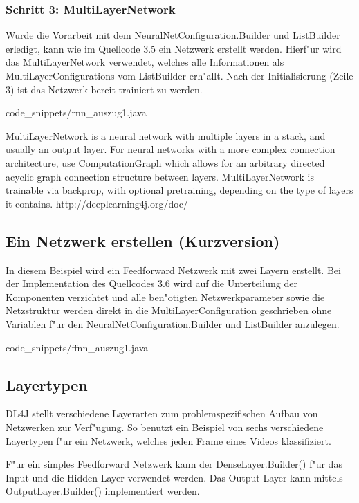 {\subsubsection{Schritt 3: MultiLayerNetwork}
Wurde die Vorarbeit mit dem NeuralNetConfiguration.Builder und ListBuilder erledigt, kann wie im Quellcode 3.5 ein Netzwerk erstellt werden. Hierf"ur wird das MultiLayerNetwork verwendet, welches alle Informationen als MultiLayerConfigurations vom ListBuilder erh"allt. Nach der Initialisierung (Zeile 3) ist das Netzwerk bereit trainiert zu werden.

{code_snippets/rnn_auszug1.java}

MultiLayerNetwork is a neural network with multiple layers in a stack, and usually an output layer. For neural networks with a more complex connection architecture, use ComputationGraph which allows for an arbitrary directed acyclic graph connection structure between layers. MultiLayerNetwork is trainable via backprop, with optional pretraining, depending on the type of layers it contains.
http://deeplearning4j.org/doc/

\subsection{Ein Netzwerk erstellen (Kurzversion)}
In diesem Beispiel wird ein Feedforward Netzwerk mit zwei Layern erstellt. Bei der Implementation des Quellcodes 3.6 wird auf die Unterteilung der Komponenten verzichtet und alle ben"otigten Netzwerkparameter sowie die Netzstruktur werden direkt in die MultiLayerConfiguration geschrieben ohne Variablen f"ur den NeuralNetConfiguration.Builder und ListBuilder anzulegen.

{code_snippets/ffnn_auszug1.java}

\subsection{Layertypen}
DL4J stellt verschiedene Layerarten zum problemspezifischen Aufbau von Netzwerken zur Verf"ugung. So benutzt ein Beispiel von \cite{DL4J} sechs verschiedene Layertypen f"ur ein Netzwerk, welches jeden Frame eines Videos klassifiziert. 

F"ur ein simples Feedforward Netzwerk kann der DenseLayer.Builder() f"ur das Input und die Hidden Layer verwendet werden. Das Output Layer kann mittels OutputLayer.Builder() implementiert werden.

}

